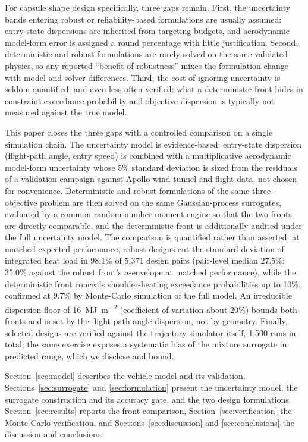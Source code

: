 For capsule shape design specifically, three gaps remain. First, the
uncertainty bands entering robust or reliability-based formulations are
usually assumed: entry-state dispersions are inherited from targeting
budgets, and aerodynamic model-form error is assigned a round percentage with
little justification. Second, deterministic and robust formulations are
rarely solved on the same validated physics, so any reported ``benefit of
robustness'' mixes the formulation change with model and solver differences.
Third, the cost of ignoring uncertainty is seldom quantified, and even less
often verified: what a deterministic front hides in constraint-exceedance
probability and objective dispersion is typically not measured against the
true model.

This paper closes the three gaps with a controlled comparison on a single
simulation chain. The uncertainty model is evidence-based: entry-state
dispersion (flight-path angle, entry speed) is combined with a multiplicative
aerodynamic model-form uncertainty whose 5\% standard deviation is sized from
the residuals of a validation campaign against Apollo wind-tunnel and flight
data, not chosen for convenience. Deterministic and robust formulations of
the same three-objective problem are then solved on the same Gaussian-process
surrogates, evaluated by a common-random-number moment engine so that the two
fronts are directly comparable, and the deterministic front is additionally
audited under the full uncertainty model. The comparison is quantified rather
than asserted: at matched expected performance, robust designs cut the
standard deviation of integrated heat load in 98.1\% of 5{,}371 design pairs
(pair-level median 27.5\%; 35.0\% against the robust front's
$\sigma$-envelope at matched performance), while the deterministic front
conceals
shoulder-heating exceedance probabilities up to 10\%, confirmed at 9.7\% by
Monte-Carlo simulation of the full model. An irreducible dispersion floor of
\SI{16}{\mega\joule\per\square\metre} (coefficient of variation about 20\%)
bounds both fronts and is set by the flight-path-angle dispersion, not by
geometry. Finally, selected designs are verified against the trajectory
simulator itself, 1{,}500 runs in total; the same exercise exposes a
systematic bias of the mixture surrogate in predicted range, which we
disclose and bound.

Section~\ref{sec:model} describes the vehicle model and its validation.
Sections~\ref{sec:surrogate} and \ref{sec:formulation} present the
uncertainty model, the surrogate construction and its accuracy gate, and the
two design formulations. Section~\ref{sec:results} reports the front
comparison, Section~\ref{sec:verification} the Monte-Carlo verification, and
Sections~\ref{sec:discussion} and \ref{sec:conclusions} the discussion and
conclusions.
